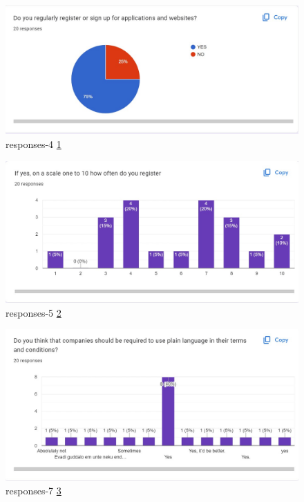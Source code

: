 \begin{figure}[H]
    \centering
    \includegraphics[scale=0.43]{Figures/responses-4.jpg}
    \caption{responses-4 \ref{fig::responses-4}}
    \label{fig::responses-4}
\end{figure}
\begin{figure}[H]
    \centering
    \includegraphics[scale=0.43]{Figures/responses-5.jpg}
    \caption{responses-5 \ref{fig::responses-5}}
    \label{fig::responses-5}
\end{figure}
\begin{figure}[H]
    \centering
    \includegraphics[scale=0.43]{Figures/responses-7.jpg}
    \caption{responses-7 \ref{fig::responses-7}}
    \label{fig::responses-7}
\end{figure}
